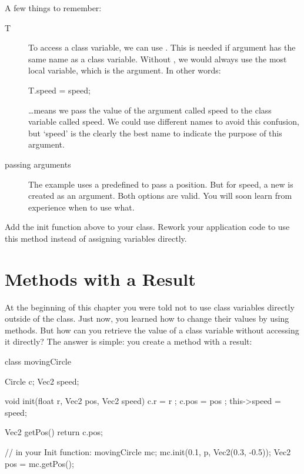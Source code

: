 A few things to remember:
\begin{description}
\item[T] To access a class variable, we can use . This is needed if argument has the same name as a class variable. Without , we would always use the most local variable, which is the argument. In other words:

\begin{code}
T.speed = speed;
\end{code}

\ldots means we pass the value of the argument called speed to the class variable called speed. We could use different names to avoid this confusion, but `speed' is the clearly the best name to indicate the purpose of this argument.

\item[passing arguments] The example uses a predefined  to pass a position. But for speed, a new  is created as an argument. Both options are valid. You will soon learn from experience when to use what.
\end{description}

\begin{exercise}
Add the init function above to your  class. Rework your application code to use this method instead of assigning variables directly.
\end{exercise}

\section{Methods with a Result}
At the beginning of this chapter you were told not to use class variables directly outside of the class. Just now, you learned how to change their values by using methods. But how can you retrieve the value of a class variable without accessing it directly? The answer is simple: you create a method with a result:

\begin{code}
class movingCircle {
  Circle c;
  Vec2 speed;
  
  void init(float r, Vec2 pos, Vec2 speed) {
    c.r         = r    ;
    c.pos       = pos  ;
    this->speed = speed;
  }
  
  Vec2 getPos() {
    return c.pos;
  }
}

// in your Init function:
movingCircle mc;
mc.init(0.1, p, Vec2(0.3, -0.5));
Vec2 pos = mc.getPos();
\end{code}

